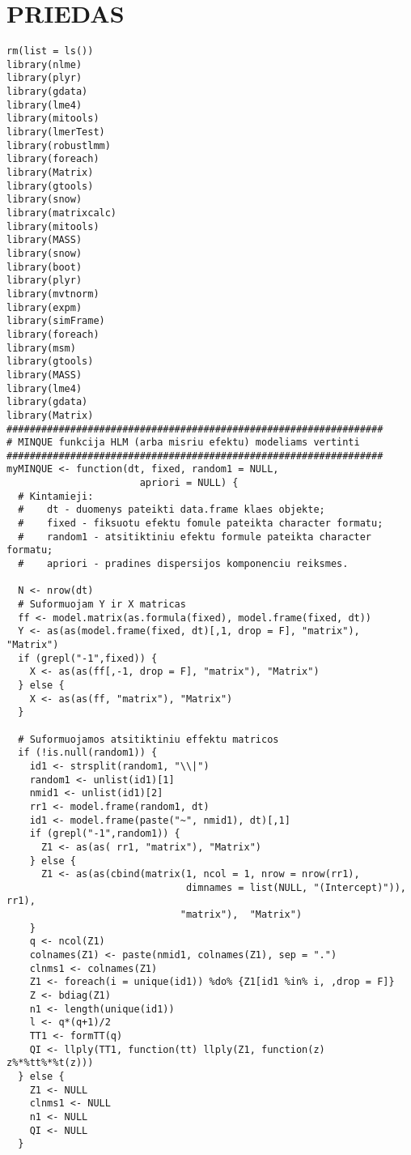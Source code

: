 \documentclass[12pt,a4paper]{article}
\begin{document}
\newpage
\begin{appendix}

 \hypertarget{appendix}{\section*{PRIEDAS}}
\begin{footnotesize}
\begin{verbatim}
rm(list = ls())
library(nlme)
library(plyr)
library(gdata)
library(lme4)
library(mitools)
library(lmerTest)
library(robustlmm)
library(foreach)
library(Matrix)
library(gtools)
library(snow)
library(matrixcalc)
library(mitools)
library(MASS)
library(snow)
library(boot)
library(plyr)
library(mvtnorm)
library(expm)
library(simFrame)
library(foreach)
library(msm)
library(gtools)
library(MASS)
library(lme4)
library(gdata)
library(Matrix)
#################################################################
# MINQUE funkcija HLM (arba misriu efektu) modeliams vertinti
#################################################################
myMINQUE <- function(dt, fixed, random1 = NULL, 
                       apriori = NULL) {
  # Kintamieji:
  #    dt - duomenys pateikti data.frame klaes objekte;
  #    fixed - fiksuotu efektu fomule pateikta character formatu;
  #    random1 - atsitiktiniu efektu formule pateikta character formatu;
  #    apriori - pradines dispersijos komponenciu reiksmes.

  N <- nrow(dt)
  # Suformuojam Y ir X matricas
  ff <- model.matrix(as.formula(fixed), model.frame(fixed, dt))
  Y <- as(as(model.frame(fixed, dt)[,1, drop = F], "matrix"), "Matrix")
  if (grepl("-1",fixed)) {
    X <- as(as(ff[,-1, drop = F], "matrix"), "Matrix")
  } else {
    X <- as(as(ff, "matrix"), "Matrix")
  }
  
  # Suformuojamos atsitiktiniu effektu matricos
  if (!is.null(random1)) {
    id1 <- strsplit(random1, "\\|")
    random1 <- unlist(id1)[1]
    nmid1 <- unlist(id1)[2]
    rr1 <- model.frame(random1, dt)
    id1 <- model.frame(paste("~", nmid1), dt)[,1]
    if (grepl("-1",random1)) {
      Z1 <- as(as( rr1, "matrix"), "Matrix")
    } else {
      Z1 <- as(as(cbind(matrix(1, ncol = 1, nrow = nrow(rr1),
                               dimnames = list(NULL, "(Intercept)")), rr1), 
                              "matrix"),  "Matrix")
    }
    q <- ncol(Z1)
    colnames(Z1) <- paste(nmid1, colnames(Z1), sep = ".")
    clnms1 <- colnames(Z1)
    Z1 <- foreach(i = unique(id1)) %do% {Z1[id1 %in% i, ,drop = F]}
    Z <- bdiag(Z1)
    n1 <- length(unique(id1))
    l <- q*(q+1)/2
    TT1 <- formTT(q)
    QI <- llply(TT1, function(tt) llply(Z1, function(z) z%*%tt%*%t(z)))
  } else {
    Z1 <- NULL
    clnms1 <- NULL
    n1 <- NULL
    QI <- NULL
  }


\end{verbatim}
\end{footnotesize}
\end{appendix}
\end{document}
